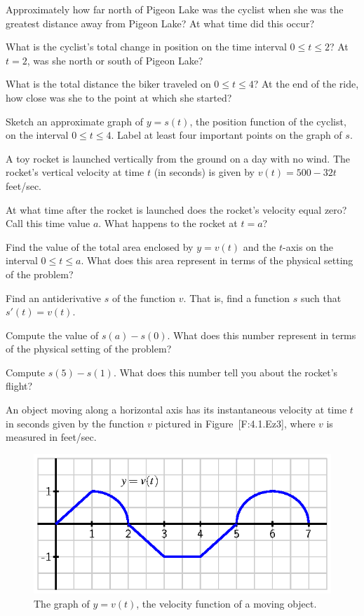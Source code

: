 Approximately how far north of Pigeon Lake was the cyclist when she was
the greatest distance away from Pigeon Lake? At what time did this
occur?

What is the cyclist's total change in position on the time interval
\(0 \le t \le 2\)? At \(t = 2\), was she north or south of Pigeon Lake?

What is the total distance the biker traveled on \(0 \le t \le 4\)? At
the end of the ride, how close was she to the point at which she
started?

Sketch an approximate graph of \(y = s(t)\), the position function of
the cyclist, on the interval \(0 \le t \le 4\). Label at least four
important points on the graph of \(s\).

A toy rocket is launched vertically from the ground on a day with no
wind. The rocket's vertical velocity at time \(t\) (in seconds) is given
by \(v(t)= 500-32t\) feet/sec.

At what time after the rocket is launched does the rocket's velocity
equal zero? Call this time value \(a\). What happens to the rocket at
\(t = a\)?

Find the value of the total area enclosed by \(y = v(t)\) and the
\(t\)-axis on the interval \(0 \le t \le a\). What does this area
represent in terms of the physical setting of the problem?

Find an antiderivative \(s\) of the function \(v\). That is, find a
function \(s\) such that \(s'(t) = v(t)\).

Compute the value of \(s(a) - s(0)\). What does this number represent in
terms of the physical setting of the problem?

Compute \(s(5) - s(1)\). What does this number tell you about the
rocket's flight?

An object moving along a horizontal axis has its instantaneous velocity
at time \(t\) in seconds given by the function \(v\) pictured in
Figure~{[}F:4.1.Ez3{]}, where \(v\) is measured in feet/sec.

\begin{figure}[htbp]
\centering
\includegraphics{figures/4_1_Ez3.eps}
\caption{The graph of \(y = v(t)\), the velocity function of a moving
object.{}}
\end{figure}

